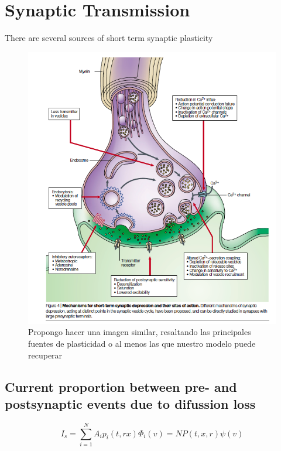 \section{Synaptic Transmission}
There are several sources of short term synaptic plasticity

\begin{figure}[h]
\begin{center}
\includegraphics[scale = 0.5]{transmitionExample.png}
\end{center}
\caption{Propongo hacer una imagen similar, resaltando las principales fuentes de plasticidad o al menos las que nuestro modelo puede recuperar}
\end{figure}



\subsection{Current proportion between pre- and postsynaptic events due to difussion loss}

\begin{equation}
    	    I_s = \sum_{i=1}^{N} A_ip_i(t,rx)\Phi_i(v) = N P(t,x,r) \psi(v)
    	\end{equation}


